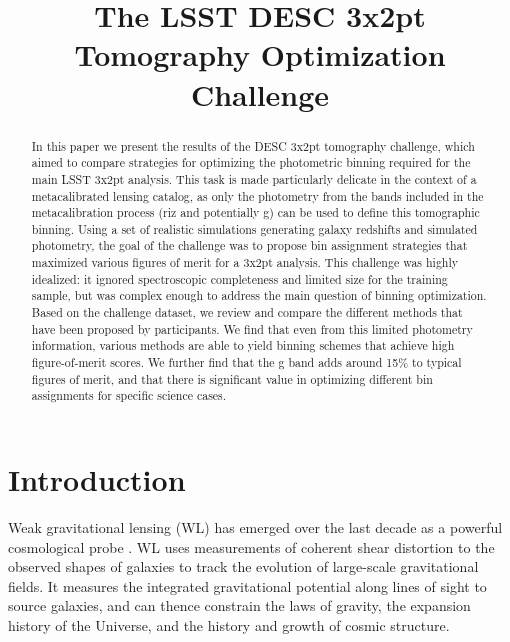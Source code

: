 \documentclass[twocolumn,twocolappendix]{aastex63}
\begin{document}
\title{The LSST DESC 3x2pt Tomography Optimization Challenge}


\begin{abstract}
In this paper we present the results of the DESC 3x2pt tomography challenge,
which aimed to compare strategies for optimizing the photometric binning required
for the main LSST 3x2pt analysis. This task is made particularly delicate in the
context of a metacalibrated lensing catalog, as only the photometry from the
bands  included in the metacalibration process (riz and potentially g) can be
used to define this tomographic binning. Using a set of realistic simulations
generating galaxy redshifts and simulated photometry, the goal of the
challenge was to propose bin assignment strategies that maximized various
figures of merit for a 3x2pt analysis. This challenge was highly idealized: it ignored
spectroscopic completeness and limited size for the training sample, but was complex enough
to address the main question of binning optimization. Based on the challenge
dataset, we review and compare the different methods that have been proposed by
participants. We find that even from this limited photometry information,
various methods are able to yield binning schemes that achieve high figure-of-merit scores.
We further find that the g band adds around 15\% to typical figures of merit, and
that there is significant value in optimizing different bin assignments for specific
science cases.
\end{abstract}





\section{Introduction}
Weak gravitational lensing (WL) has emerged over the last decade as a powerful
cosmological probe \citep{cfhtlens,rcslens,des,kids,hsc}.  WL
uses measurements of coherent shear distortion to the observed shapes of galaxies
to track the evolution of large-scale gravitational fields.  It measures the integrated
gravitational potential along lines of sight to source galaxies, and can thence constrain
the laws of gravity, the expansion history of the Universe, and the history and growth
of cosmic structure.
\end{document}
